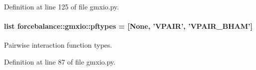 \-Definition at line 125 of file gmxio.\-py.

\hypertarget{namespaceforcebalance_1_1gmxio_a1e3fab50f3ebc3477ff3fb31671e840b}{
\paragraph[{pftypes}]{\setlength{\rightskip}{0pt plus 5cm}list {\bf forcebalance\-::gmxio\-::pftypes} = \mbox{[}\-None, '\-V\-P\-A\-I\-R', '\-V\-P\-A\-I\-R\-\_\-\-B\-H\-A\-M'\mbox{]}}}\label{namespaceforcebalance_1_1gmxio_a1e3fab50f3ebc3477ff3fb31671e840b}


\-Pairwise interaction function types. 



\-Definition at line 87 of file gmxio.\-py.

